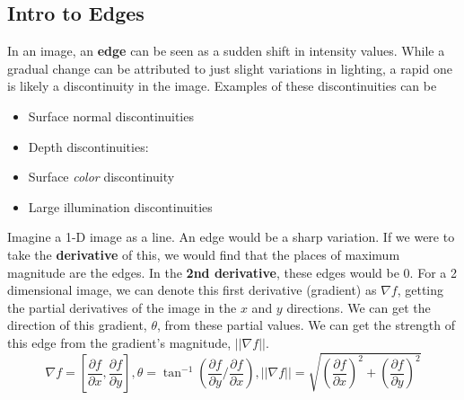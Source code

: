 \documentclass{article}
\begin{document}
\subsection{Intro to Edges}
In an image, an \textbf{edge} can be seen as a sudden shift in intensity values. While a gradual change can be attributed to just slight variations in lighting, a rapid one is likely a discontinuity in the image. Examples of these discontinuities can be 
\begin{itemize}
    \item Surface normal discontinuities
    \item Depth discontinuities: 
    \item Surface \textit{color} discontinuity
    \item Large illumination discontinuities
\end{itemize}
Imagine a 1-D image as a line. An edge would be a sharp variation. If we were to take the \textbf{derivative} of this, we would find that the places of maximum magnitude are the edges. In the \textbf{2nd derivative}, these edges would be 0. For a 2 dimensional image, we can denote this first derivative (gradient) as $\nabla f$, getting the partial derivatives of the image in the $x$ and $y$ directions. We can get the direction of this gradient, $\theta$, from these partial values. We can get the strength of this edge from the gradient's magnitude, $||\nabla f||$. 
$$\nabla f = [\frac{\partial f}{\partial x}, \frac{\partial f}{\partial y}], \theta = \tan^{-1}({\frac{\partial f}{\partial y}/\frac{\partial f}{\partial x}}),||\nabla f|| = \sqrt{(\frac{\partial f}{\partial x})^2 + (\frac{\partial f}{\partial y})^2}$$
\end{document}
